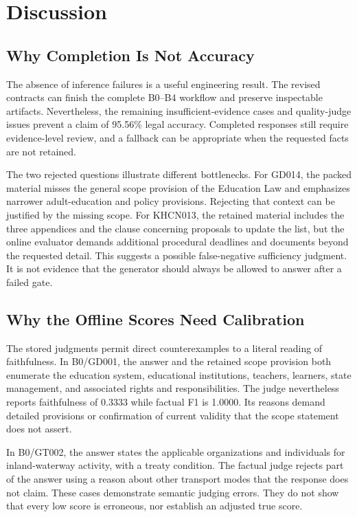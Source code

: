 \section{Discussion}
\subsection{Why Completion Is Not Accuracy}
The absence of inference failures is a useful engineering result. The revised contracts can finish the complete B0--B4 workflow and preserve inspectable artifacts. Nevertheless, the remaining insufficient-evidence cases and quality-judge issues prevent a claim of 95.56\% legal accuracy. Completed responses still require evidence-level review, and a fallback can be appropriate when the requested facts are not retained.

The two rejected questions illustrate different bottlenecks. For GD014, the packed material misses the general scope provision of the Education Law and emphasizes narrower adult-education and policy provisions. Rejecting that context can be justified by the missing scope. For KHCN013, the retained material includes the three appendices and the clause concerning proposals to update the list, but the online evaluator demands additional procedural deadlines and documents beyond the requested detail. This suggests a possible false-negative sufficiency judgment. It is not evidence that the generator should always be allowed to answer after a failed gate.

\subsection{Why the Offline Scores Need Calibration}
The stored judgments permit direct counterexamples to a literal reading of faithfulness. In B0/GD001, the answer and the retained scope provision both enumerate the education system, educational institutions, teachers, learners, state management, and associated rights and responsibilities. The judge nevertheless reports faithfulness of 0.3333 while factual F1 is 1.0000. Its reasons demand detailed provisions or confirmation of current validity that the scope statement does not assert.

In B0/GT002, the answer states the applicable organizations and individuals for inland-waterway activity, with a treaty condition. The factual judge rejects part of the answer using a reason about other transport modes that the response does not claim. These cases demonstrate semantic judging errors. They do not show that every low score is erroneous, nor establish an adjusted true score.

